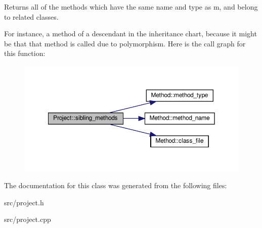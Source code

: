 Returns all of the methods which have the same name and type as {\ttfamily m}, and belong to related classes.

For instance, a method of a descendant in the inheritance chart, because it might be that that method is called due to polymorphism. Here is the call graph for this function\+:\nopagebreak
\begin{figure}[H]
\begin{center}
\leavevmode
\includegraphics[width=350pt]{classProject_afee58125bfee1c7a1871be7805e855fa_cgraph}
\end{center}
\end{figure}


The documentation for this class was generated from the following files\+:\begin{DoxyCompactItemize}
\item 
src/project.\+h\item 
src/project.\+cpp\end{DoxyCompactItemize}
